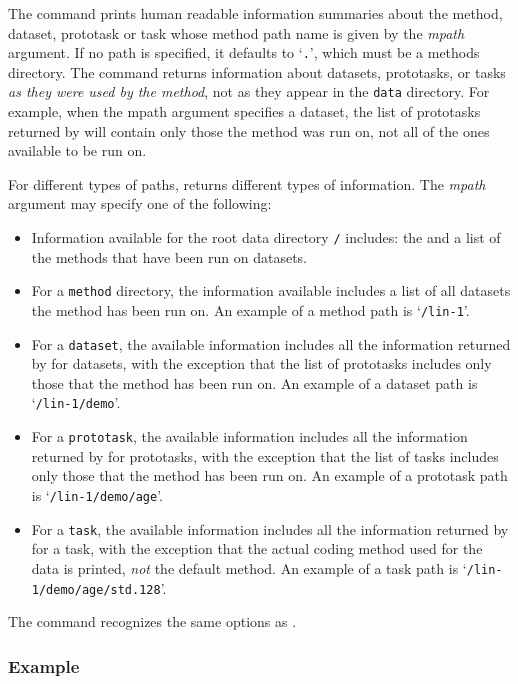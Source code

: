 The \minfo{} command prints human readable information summaries about
the \delve{} method, dataset, prototask or task whose \delve{} method
path name is given by the \textit{mpath} argument. If no path is
specified, it defaults to `\texttt{.}', which must be a \delve{}
methods directory. The \minfo{} command returns information about
datasets, prototasks, or tasks \emph{as they were used by the method},
not as they appear in the \texttt{data} directory.  For example, when
the mpath argument specifies a dataset, the list of prototasks
returned by \minfo{} will contain only those the method was run on,
not all of the ones available to be run on.

For different types of paths, \minfo{} returns different types of
information. The \textit{mpath} argument may specify one of the
following:
\begin{itemize}
\item
    Information available for the root data directory \texttt{/}
    includes: the \delvepath{} and a list of the methods that have
    been run on \delve{} datasets.
\item
    For a \texttt{method} directory, the information available
    includes a list of all datasets the method has been run on. An
    example of a method path is `\texttt{/lin-1}'.
\item
    For a \texttt{dataset}, the available information includes all the
    information returned by \dinfo{} for datasets, with the exception
    that the list of prototasks includes only those that the method
    has been run on.  An example of a dataset path is
    `\texttt{/lin-1/demo}'.
\item
    For a \texttt{prototask}, the available information includes all the
    information returned by \dinfo{} for prototasks, with the exception
    that the list of tasks includes only those that the method has
    been run on.  An example of a prototask path is
    `\texttt{/lin-1/demo/age}'.
\item
    For a \texttt{task}, the available information includes all the
    information returned by \dinfo{} for a task, with the exception
    that the actual coding method used for the data is printed,
    \textit{not} the default method.  An example of a task path is
    `\texttt{/lin-1/demo/age/std.128}'.
\end{itemize}

The \minfo{} command recognizes the same options as \dinfo.

\subsubsection*{Example}

